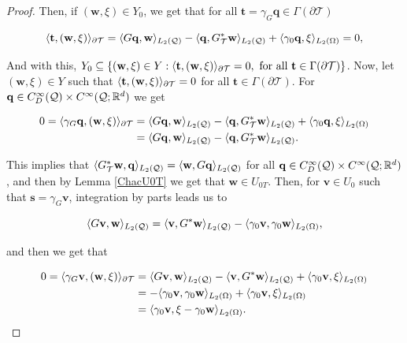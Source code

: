 \begin{proof}
    Then, if $(\mathbf{w},\xi)\in Y_0$, we get that for all $\mathbf{t}=\gamma_G\mathbf{q}\in\Gamma(\partial\mathcal{T})$

    $$\langle \mathbf{t} , (\mathbf{w},\xi) \rangle_{\partial\mathcal{T}}=\langle G\mathbf{q} , \mathbf{w} \rangle_{L_2(\mathcal{Q})}-\langle \mathbf{q} , G^*_{\mathcal{T}}\mathbf{w} \rangle_{L_2(\mathcal{Q})}+\langle \gamma_0\mathbf{q} , \xi \rangle_{L_2(\Omega)}=0,$$

    And with this, $Y_0\subseteq\{(\mathbf{w},\xi)\in Y: \langle \mathbf{t} , (\mathbf{w},\xi) \rangle_{\partial\mathcal{T}}=0, \text{ for all }\mathbf{t}\in\Gamma(\partial\mathcal{T})\}$. Now, let $(\mathbf{w},\xi)\in Y$ such that $\langle \mathbf{t} , (\mathbf{w},\xi) \rangle_{\partial\mathcal{T}}=0$ for all $\mathbf{t}\in\Gamma(\partial\mathcal{T})$. For $\mathbf{q}\in C_D^\infty(\mathcal{Q})\times C^\infty(\mathcal{Q};\mathbb{R}^d)$ we get


    \begin{align*}
        0=\langle \gamma_G\mathbf{q} , (\mathbf{w},\xi) \rangle_{\partial\mathcal{T}}&=\langle G\mathbf{q} , \mathbf{w} \rangle_{L_2(\mathcal{Q})}-\langle \mathbf{q} , G^*_{\mathcal{T}}\mathbf{w} \rangle_{L_2(\mathcal{Q})}+\langle \gamma_0\mathbf{q} , \xi \rangle_{L_2(\Omega)}\\
        &=\langle G\mathbf{q} , \mathbf{w} \rangle_{L_2(\mathcal{Q})}-\langle \mathbf{q} , G^*_{\mathcal{T}}\mathbf{w} \rangle_{L_2(\mathcal{Q})}.
    \end{align*}

    
    This implies that $\langle G^*_{\mathcal{T}}\mathbf{w} , \mathbf{q} \rangle_{L_2(\mathcal{Q})}=\langle \mathbf{w} , G\mathbf{q} \rangle_{L_2(\mathcal{Q})}$ for all $\mathbf{q}\in C_D^\infty(\mathcal{Q})\times C^\infty(\mathcal{Q};\mathbb{R}^d)$, and then by Lemma \ref{ChacU0T} we get that $\mathbf{w}\in U_{0T}$. Then, for $\mathbf{v}\in U_0$ such that $\mathbf{s}=\gamma_G\mathbf{v}$, integration by parts leads us to

    $$\langle G\mathbf{v} , \mathbf{w} \rangle_{L_2(\mathcal{Q})}=\langle \mathbf{v} , G^*\mathbf{w} \rangle_{L_2(\mathcal{Q})}-\langle \gamma_0\mathbf{v} , \gamma_0\mathbf{w} \rangle_{L_2(\Omega)},$$

    and then we get that

    \begin{align*}
        0=\langle \gamma_G\mathbf{v} , (\mathbf{w},\xi) \rangle_{\partial\mathcal{T}}&=\langle G\mathbf{v} , \mathbf{w} \rangle_{L_2(\mathcal{Q})}-\langle \mathbf{v} , G^*\mathbf{w} \rangle_{L_2(\mathcal{Q})}+\langle \gamma_0\mathbf{v} , \xi \rangle_{L_2(\Omega)}\\&=-\langle \gamma_0\mathbf{v} , \gamma_0\mathbf{w} \rangle_{L_2(\Omega)}+\langle \gamma_0\mathbf{v} , \xi \rangle_{L_2(\Omega)}\\&=\langle \gamma_0\mathbf{v} , \xi-\gamma_0\mathbf{w} \rangle_{L_2(\Omega)}.
    \end{align*}



\end{proof}
